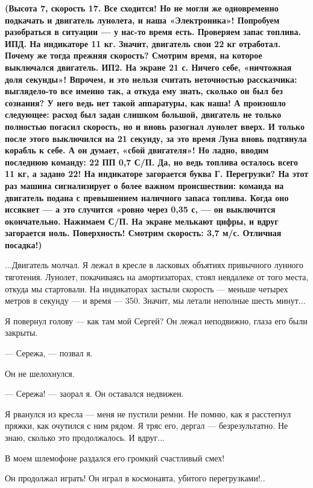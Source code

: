 \documentclass[11pt,a4paper,oneside]{article}
\begin{document}
\textbf{
(Высота 7, скорость 17. Все сходится! Но не могли же одновременно подкачать и двигатель лунолета, и наша «Электроника»! Попробуем разобраться в ситуации — у нас-то время есть. Проверяем запас топлива. ИПД. На индикаторе 11 кг. Значит, двигатель свои 22 кг отработал. Почему же тогда прежняя скорость? Смотрим время, на которое выключался двигатель. ИП2. На экране 21 с. Ничего себе, «ничтожная доля секунды»! Впрочем, и это нельзя считать неточностью рассказчика: выглядело-то все именно так, а откуда ему знать, сколько он был без сознания? У него ведь нет такой аппаратуры, как наша! А произошло следующее: расход был задан слишком большой, двигатель не только полностью погасил скорость, но и вновь разогнал лунолет вверх. И только после этого выключился на 21 секунду, за это время Луна вновь подтянула корабль к себе. А он думает, «сбой двигателя»! Но ладно, вводим последнюю команду: 22 ПП 0,7 С/П. Да, но ведь топлива осталось всего 11 кг, а задано 22! На индикаторе загорается буква Г. Перегрузки? На этот раз машина сигнализирует о более важном происшествии: команда на двигатель подана с превышением наличного запаса топлива. Когда оно иссякнет — а это случится «ровно через 0,35 с, — он выключится окончательно. Нажимаем С/П. На экране мелькают цифры, и вдруг загорается ноль. Поверхность! Смотрим скорость: 3,7 м/с. Отличная посадка!)}

...Двигатель молчал. Я лежал в кресле в ласковых объятиях привычного лунного тяготения. Лунолет, покачиваясь на амортизаторах, стоял невдалеке от того места, откуда мы стартовали. На индикаторах застыли скорость — меньше четырех метров в секунду — и время — 350. Значит, мы летали неполные шесть минут...

Я повернул голову — как там мой Сергей? Он лежал неподвижно, глаза его были закрыты.

— Сережа, — позвал я.

Он не шелохнулся.

— Сережа! — заорал я. Он оставался недвижен.

Я рванулся из кресла — меня не пустили ремни. Не помню, как я расстегнул пряжки, как очутился с ним рядом. Я тряс его, дергал — безрезультатно. Не знаю, сколько это продолжалось. И вдруг...

В моем шлемофоне раздался его громкий счастливый смех!

Он продолжал играть! Он играл в космонавта, убитого перегрузками!..
\end{document}
